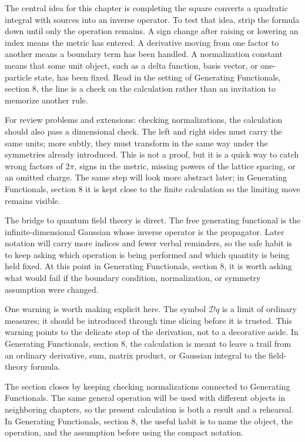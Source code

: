 The central idea for this chapter is completing the square converts a quadratic integral with sources into an inverse operator.  To test that idea, strip the formula down until only the operation remains.  A sign change after raising or lowering an index means the metric has entered.  A derivative moving from one factor to another means a boundary term has been handled.  A normalization constant means that some unit object, such as a delta function, basis vector, or one-particle state, has been fixed.  Read in the setting of Generating Functionals, section 8, the line is a check on the calculation rather than an invitation to memorize another rule.

For review problems and extensions: checking normalizations, the calculation should also pass a dimensional check.  The left and right sides must carry the same units; more subtly, they must transform in the same way under the symmetries already introduced.  This is not a proof, but it is a quick way to catch wrong factors of \(2\pi\), signs in the metric, missing powers of the lattice spacing, or an omitted charge.  The same step will look more abstract later; in Generating Functionals, section 8 it is kept close to the finite calculation so the limiting move remains visible.

The bridge to quantum field theory is direct.  The free generating functional is the infinite-dimensional Gaussian whose inverse operator is the propagator.  Later notation will carry more indices and fewer verbal reminders, so the safe habit is to keep asking which operation is being performed and which quantity is being held fixed.  At this point in Generating Functionals, section 8, it is worth asking what would fail if the boundary condition, normalization, or symmetry assumption were changed.

One warning is worth making explicit here.  The symbol \(\mathcal D q\) is a limit of ordinary measures; it should be introduced through time slicing before it is trusted.  This warning points to the delicate step of the derivation, not to a decorative aside.  In Generating Functionals, section 8, the calculation is meant to leave a trail from an ordinary derivative, sum, matrix product, or Gaussian integral to the field-theory formula.

The section closes by keeping checking normalizations connected to Generating Functionals.  The same general operation will be used with different objects in neighboring chapters, so the present calculation is both a result and a rehearsal.  In Generating Functionals, section 8, the useful habit is to name the object, the operation, and the assumption before using the compact notation.



